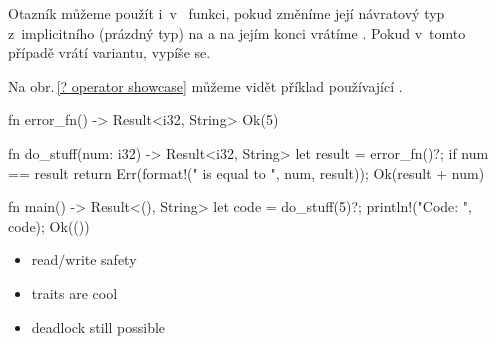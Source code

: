 \documentclass[main.tex]{subfiles}
\begin{document}
Otazník můžeme použít i~v~ funkci, pokud změníme její návratový typ
z~implicitního \irust{()} (prázdný typ) na  a na jejím konci vrátíme
. Pokud v~tomto případě  vrátí  variantu, vypíše se.

Na obr.\,\ref{? operator showcase} můžeme vidět příklad používající .

\obrazek
\begin{rustcode}
fn error_fn() -> Result<i32, String> {
    Ok(5)
}

fn do_stuff(num: i32) -> Result<i32, String> {
    let result = error_fn()?;
    if num == result {
        return Err(format!("{} is equal to {}", num, result));
    }
    Ok(result + num)
}

fn main() -> Result<(), String> {
    let code = do_stuff(5)?;
    println!("Code: {}", code);
    Ok(())
}
\end{rustcode}
\newline
{}

\begin{itemize}
    \item read/write safety
    \item traits are cool
    \item deadlock still possible
\end{itemize}
\end{document}
